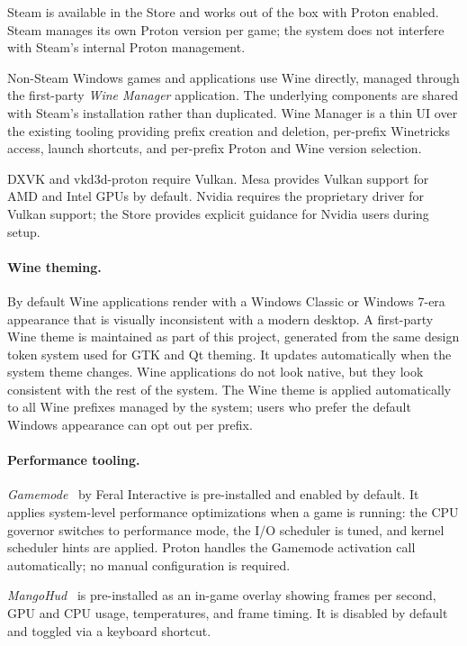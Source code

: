 Steam is available in the Store and works out of the box with Proton enabled.
Steam manages its own Proton version per game; the system does not interfere
with Steam's internal Proton management.

Non-Steam Windows games and applications use Wine directly, managed through
the first-party \emph{Wine Manager} application. The underlying components are
shared with Steam's installation rather than duplicated. Wine Manager is a thin
UI over the existing tooling providing prefix creation and deletion, per-prefix
Winetricks access, launch shortcuts, and per-prefix Proton and Wine version
selection.

DXVK and vkd3d-proton require Vulkan. Mesa provides Vulkan support for AMD
and Intel GPUs by default. Nvidia requires the proprietary driver for Vulkan
support; the Store provides explicit guidance for Nvidia users during setup.

\paragraph{Wine theming.}
By default Wine applications render with a Windows Classic or Windows 7-era
appearance that is visually inconsistent with a modern desktop. A first-party
Wine theme is maintained as part of this project, generated from the same
design token system used for GTK and Qt theming. It updates automatically
when the system theme changes. Wine applications do not look native, but they
look consistent with the rest of the system. The Wine theme is applied
automatically to all Wine prefixes managed by the system; users who prefer
the default Windows appearance can opt out per prefix.

\paragraph{Performance tooling.}
\emph{Gamemode}~\cite{gamemode} by Feral Interactive is pre-installed and
enabled by default. It applies system-level performance optimizations when a
game is running: the CPU governor switches to performance mode, the I/O
scheduler is tuned, and kernel scheduler hints are applied. Proton handles the
Gamemode activation call automatically; no manual configuration is required.

\emph{MangoHud}~\cite{mangohud} is pre-installed as an in-game overlay showing
frames per second, GPU and CPU usage, temperatures, and frame timing. It is
disabled by default and toggled via a keyboard shortcut.

